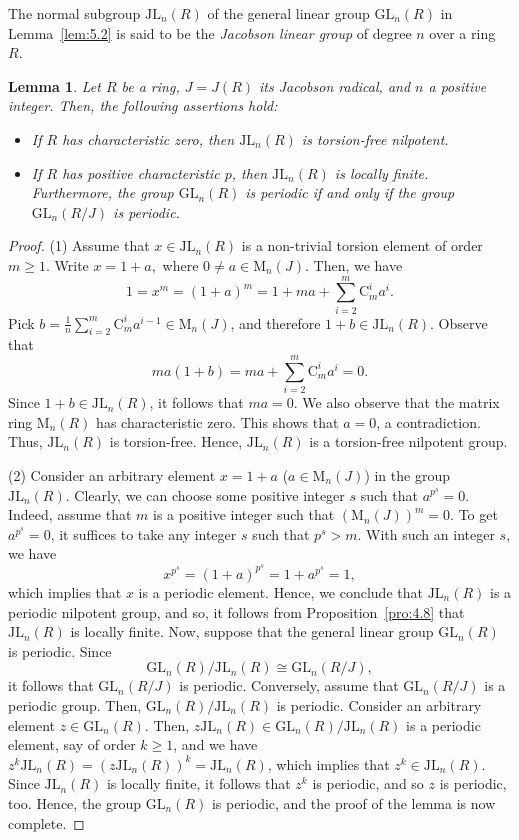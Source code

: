 \documentclass{amsart}
\newtheorem{lemma}[theorem]{Lemma}
\theoremstyle{definition}
\begin{document}
The normal subgroup $\mathrm{JL}_n(R)$ of the general linear group $\mathrm{GL}_n(R)$ in Lemma~\ref{lem:5.2} is said to be the \textit{Jacobson linear group} of degree $n$ over a ring $R.$
\begin{lemma}\label{lem:5.3} Let $R$ be a ring, $J=J(R)$ its Jacobson radical, and $n$ a positive integer. Then, the following assertions hold:
\begin{itemize}
\item [(1)] If $R$ has characteristic zero, then $\mathrm{JL}_n(R)$ is torsion-free nilpotent.
\item [(2)] If $R$ has positive characteristic $p$, then $\mathrm{JL}_n(R)$ is locally finite. Furthermore, the group $\mathrm{GL}_n(R)$ is periodic if and only if the group $\mathrm{GL}_n(R/J)$ is periodic.
\end{itemize} 
\end{lemma} 
\begin{proof} (1) Assume that $x\in \mathrm{JL}_n(R)$ is a non-trivial torsion element of order $m\geq 1.$ Write $x=1+a,$ where $0\ne a\in \mathrm{M}_n(J)$. Then, we have $$1=x^m=(1+a)^m=1+ma+\sum_{i=2}^{m}\mathrm{C}_m^ia^i.$$ Pick $b=\displaystyle\frac{1}{n}\sum_{i=2}^{m}\mathrm{C}_m^ia^{i-1}\in \mathrm{M}_n(J)$, and therefore $1+b\in \mathrm{JL}_n(R).$ Observe that $$ma(1+b)=ma+\sum_{i=2}^{m}\mathrm{C}_m^ia^i=0.$$ Since $1+b\in \mathrm{JL}_n(R)$, it follows that $ma=0.$ We also observe that the matrix ring $\mathrm{M}_n(R)$ has characteristic zero. This shows that $a=0$, a contradiction. Thus, $\mathrm{JL}_n(R)$ is torsion-free. Hence, $\mathrm{JL}_n(R)$ is a torsion-free nilpotent group.  
	
(2) Consider an arbitrary element $x=1+a$ ($a\in \mathrm{M}_n(J)$) in the group $\mathrm{JL}_n(R)$. Clearly, we can choose some positive integer $s$ such that $a^{p^s}=0$. Indeed, assume that $m$ is a positive integer such that $(\mathrm{M}_n(J))^m=0$. To get $a^{p^s}=0$, it suffices to take any integer $s$ such that $p^s>m$. With such an integer $s$, we have  $$x^{p^s}=(1+a)^{p^s}=1+a^{p^s}=1,$$ which implies that $x$ is a periodic element. Hence, we conclude that $\mathrm{JL}_n(R)$ is a periodic nilpotent group, and so, it follows from Proposition~\ref{pro:4.8} that $\mathrm{JL}_n(R)$ is locally finite. Now, suppose that the general linear group $\mathrm{GL}_n(R)$ is periodic. Since $$\mathrm{GL}_n(R)/\mathrm{JL}_n(R)\cong \mathrm{GL}_n(R/J),$$ it follows that $\mathrm{GL}_n(R/J)$ is periodic. Conversely, assume that $\mathrm{GL}_n(R/J)$ is a periodic group. Then, $\mathrm{GL}_n(R)/\mathrm{JL}_n(R)$ is periodic. Consider an arbitrary element $z\in \mathrm{GL}_n(R)$. Then, $z\mathrm{JL}_n(R)\in \mathrm{GL}_n(R)/\mathrm{JL}_n(R)$ is a periodic element, say of order $k\ge 1$, and we have $z^k\mathrm{JL}_n(R)=(z\mathrm{JL}_n(R))^k=\mathrm{JL}_n(R)$, which implies that $z^k\in \mathrm{JL}_n(R)$. Since $\mathrm{JL}_n(R)$ is locally finite, it follows that $z^k$ is  periodic, and so $z$ is periodic, too. Hence, the group $\mathrm{GL}_n(R)$ is periodic, and the proof of the lemma is now complete.	
\end{proof}	
\end{document}
